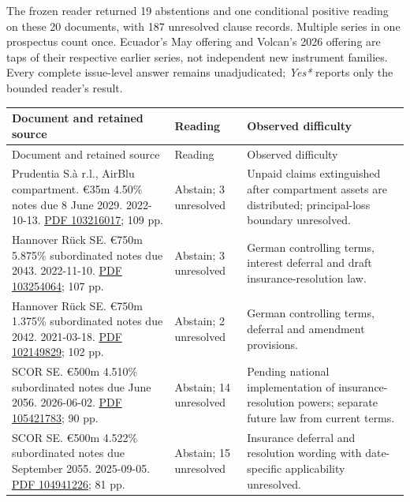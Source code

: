 \documentclass[12pt,a4paper,oneside,openany]{book}
\begin{document}
The frozen reader returned 19 abstentions and one conditional positive
reading on these 20 documents, with 187 unresolved clause records. Multiple
series in one prospectus count once. Ecuador's May offering and Volcan's
2026 offering are taps of their respective earlier series, not independent
new instrument families. Every complete issue-level answer remains
unadjudicated; \emph{Yes*} reports only the bounded reader's result.

{\small
\begin{longtable}{P{0.44\textwidth}P{0.12\textwidth}P{0.34\textwidth}}
\toprule
Document and retained source & Reading & Observed difficulty \\
\midrule
\endfirsthead
\toprule
Document and retained source & Reading & Observed difficulty \\
\midrule
\endhead
Prudentia S.à r.l., AirBlu compartment. €35m 4.50\% notes due 8 June 2029. 2022-10-13. \href{../prospectus/difficulty-2026-10-04/pdfs/case-103216017.pdf}{PDF 103216017}; 109 pp. & Abstain; 3 unresolved & Unpaid claims extinguished after compartment assets are distributed; principal-loss boundary unresolved. \\

Hannover Rück SE. €750m 5.875\% subordinated notes due 2043. 2022-11-10. \href{../prospectus/difficulty-2026-10-04/pdfs/case-103254064.pdf}{PDF 103254064}; 107 pp. & Abstain; 3 unresolved & German controlling terms, interest deferral and draft insurance-resolution law. \\

Hannover Rück SE. €750m 1.375\% subordinated notes due 2042. 2021-03-18. \href{../prospectus/difficulty-2026-10-04/pdfs/case-102149829.pdf}{PDF 102149829}; 102 pp. & Abstain; 2 unresolved & German controlling terms, deferral and amendment provisions. \\

SCOR SE. €500m 4.510\% subordinated notes due June 2056. 2026-06-02. \href{../prospectus/difficulty-2026-10-04/pdfs/case-105421783.pdf}{PDF 105421783}; 90 pp. & Abstain; 14 unresolved & Pending national implementation of insurance-resolution powers; separate future law from current terms. \\

SCOR SE. €500m 4.522\% subordinated notes due September 2055. 2025-09-05. \href{../prospectus/difficulty-2026-10-04/pdfs/case-104941226.pdf}{PDF 104941226}; 81 pp. & Abstain; 15 unresolved & Insurance deferral and resolution wording with date-specific applicability unresolved. \\


\end{longtable}}
\end{document}
